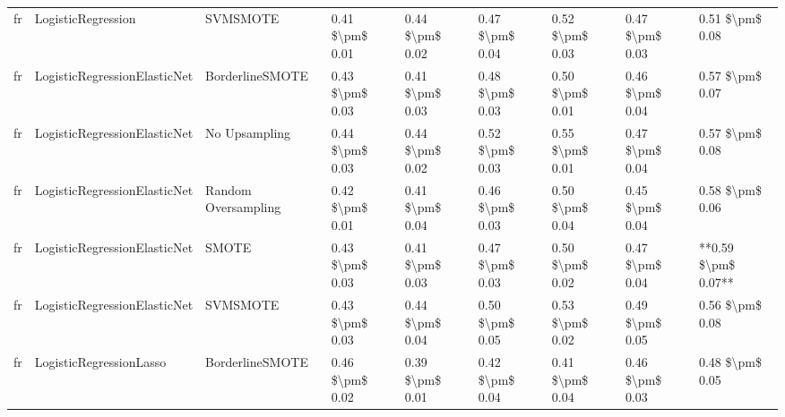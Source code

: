 \begin{tabular}{lllllllll}
      fr &              LogisticRegression &                      SVMSMOTE & 0.41 \$\textbackslash pm\$ 0.01 &           0.44 \$\textbackslash pm\$ 0.02 &       0.47 \$\textbackslash pm\$ 0.04 &        0.52 \$\textbackslash pm\$ 0.03 &                         0.47 \$\textbackslash pm\$ 0.03 &     0.51 \$\textbackslash pm\$ 0.08 \\
      fr &    LogisticRegressionElasticNet &               BorderlineSMOTE & 0.43 \$\textbackslash pm\$ 0.03 &           0.41 \$\textbackslash pm\$ 0.03 &       0.48 \$\textbackslash pm\$ 0.03 &        0.50 \$\textbackslash pm\$ 0.01 &                         0.46 \$\textbackslash pm\$ 0.04 &     0.57 \$\textbackslash pm\$ 0.07 \\
      fr &    LogisticRegressionElasticNet &                 No Upsampling & 0.44 \$\textbackslash pm\$ 0.03 &           0.44 \$\textbackslash pm\$ 0.02 &       0.52 \$\textbackslash pm\$ 0.03 &        0.55 \$\textbackslash pm\$ 0.01 &                         0.47 \$\textbackslash pm\$ 0.04 &     0.57 \$\textbackslash pm\$ 0.08 \\
      fr &    LogisticRegressionElasticNet &           Random Oversampling & 0.42 \$\textbackslash pm\$ 0.01 &           0.41 \$\textbackslash pm\$ 0.04 &       0.46 \$\textbackslash pm\$ 0.03 &        0.50 \$\textbackslash pm\$ 0.04 &                         0.45 \$\textbackslash pm\$ 0.04 &     0.58 \$\textbackslash pm\$ 0.06 \\
      fr &    LogisticRegressionElasticNet &                         SMOTE & 0.43 \$\textbackslash pm\$ 0.03 &           0.41 \$\textbackslash pm\$ 0.03 &       0.47 \$\textbackslash pm\$ 0.03 &        0.50 \$\textbackslash pm\$ 0.02 &                         0.47 \$\textbackslash pm\$ 0.04 & **0.59 \$\textbackslash pm\$ 0.07** \\
      fr &    LogisticRegressionElasticNet &                      SVMSMOTE & 0.43 \$\textbackslash pm\$ 0.03 &           0.44 \$\textbackslash pm\$ 0.04 &       0.50 \$\textbackslash pm\$ 0.05 &        0.53 \$\textbackslash pm\$ 0.02 &                         0.49 \$\textbackslash pm\$ 0.05 &     0.56 \$\textbackslash pm\$ 0.08 \\
      fr &         LogisticRegressionLasso &               BorderlineSMOTE & 0.46 \$\textbackslash pm\$ 0.02 &           0.39 \$\textbackslash pm\$ 0.01 &       0.42 \$\textbackslash pm\$ 0.04 &        0.41 \$\textbackslash pm\$ 0.04 &                         0.46 \$\textbackslash pm\$ 0.03 &     0.48 \$\textbackslash pm\$ 0.05 \\

\end{tabular}
